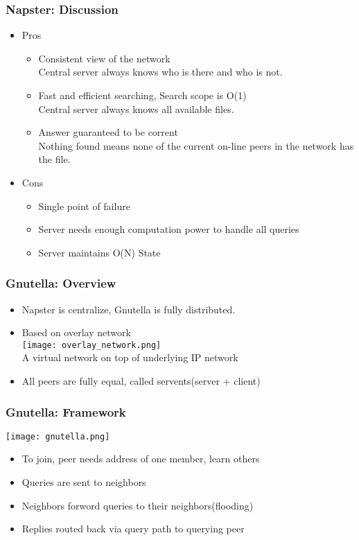 \begin{frame}
    \frametitle{Napster: Discussion}
    \begin{itemize}
        \item Pros
        \begin{itemize}
            \item Consistent view of the network \\
                Central server always knows who is there and who is not.
            \item Fast and efficient searching, Search scope is O(1) \\
                Central server always knows all available files.
            \item Answer guaranteed to be corrent \\
                Nothing found means none of the current on-line peers in the network has the file.
        \end{itemize}
        \item Cons
        \begin{itemize}
            \item Single point of failure
            \item Server needs enough computation power to handle all queries
            \item Server maintains O(N) State
        \end{itemize}
    \end{itemize}
\end{frame}

\begin{frame}
    \frametitle{Gnutella: Overview}
    \begin{itemize}
        \item Napster is centralize, Gnutella is fully distributed.
        \item Based on overlay network \\
            \texttt{[image: overlay\_network.png]} \\
            A virtual network on top of underlying IP network
        \item All peers are fully equal, called servents(server + client)
    \end{itemize}
\end{frame}

\begin{frame}
    \frametitle{Gnutella: Framework}
    \texttt{[image: gnutella.png]}
    \begin{itemize}
        \item To join, peer needs address of one member, learn others
        \item Queries are sent to neighbors
        \item Neighbors forword queries to their neighbors(\alert{flooding})
        \item Replies routed back via query path to querying peer
    \end{itemize}
\end{frame}

